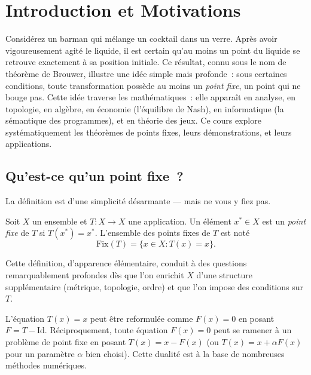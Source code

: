 \chapter{Introduction et Motivations}\label{ch:introduction}

Consid\'erez un barman qui m\'elange un cocktail dans un verre. Apr\`es avoir
vigoureusement agit\'e le liquide, il est certain qu'au moins un point du
liquide se retrouve exactement \`a sa position initiale. Ce r\'esultat,
connu sous le nom de th\'eor\`eme de Brouwer, illustre une id\'ee simple mais
profonde~: sous certaines conditions, toute transformation poss\`ede au
moins un \emph{point fixe}, un point qui ne bouge pas. Cette id\'ee traverse
les math\'ematiques~: elle appara\^it en analyse, en topologie, en
alg\`ebre, en \'economie (l'\'equilibre de Nash), en informatique (la
s\'emantique des programmes), et en th\'eorie des jeux. Ce cours explore
syst\'ematiquement les th\'eor\`emes de points fixes, leurs d\'emonstrations,
et leurs applications.

\section{Qu'est-ce qu'un point fixe~?}

La d\'efinition est d'une simplicit\'e d\'esarmante --- mais ne vous y fiez pas.

\begin{definition}
Soit $X$ un ensemble et $T : X \to X$ une application. Un \'el\'ement $x^* \in X$
est un \emph{point fixe} de $T$ si $T(x^*) = x^*$.
L'ensemble des points fixes de $T$ est not\'e
\[
    \mathrm{Fix}(T) = \{ x \in X : T(x) = x \}.
\]
\end{definition}

Cette d\'efinition, d'apparence \'el\'ementaire, conduit \`a des questions
remarquablement profondes d\`es que l'on enrichit $X$ d'une structure
suppl\'ementaire (m\'etrique, topologie, ordre) et que l'on impose des
conditions sur $T$.

\begin{remarque}
L'\'equation $T(x) = x$ peut \^etre reformul\'ee comme $F(x) = 0$ en posant
$F = T - \mathrm{Id}$. R\'eciproquement, toute \'equation $F(x) = 0$ peut se
ramener \`a un probl\`eme de point fixe en posant $T(x) = x - F(x)$ (ou
$T(x) = x + \alpha F(x)$ pour un param\`etre $\alpha$ bien choisi). Cette
dualit\'e est \`a la base de nombreuses m\'ethodes num\'eriques.
\end{remarque}

